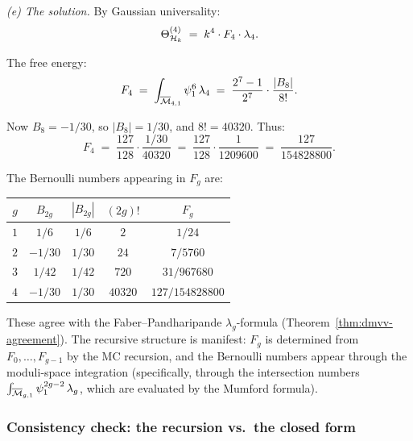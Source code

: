 \begin{computation}
\medskip\noindent\emph{(e) The solution.}
By Gaussian universality:
\begin{equation}\label{eq:thqg-VII-heis-theta4}
\Theta^{(4)}_{\mathcal{H}_k}
\;=\;
k^4 \cdot F_4 \cdot \lambda_4.
\end{equation}

The free energy:
\begin{equation}\label{eq:thqg-VII-heis-F4}
F_4
\;=\;
\int_{\overline{\mathcal{M}}_{4,1}} \psi_1^{6}\,\lambda_4
\;=\;
\frac{2^7 - 1}{2^7} \cdot \frac{|B_8|}{8!}.
\end{equation}

Now $B_8 = -1/30$, so $|B_8| = 1/30$, and $8! = 40320$. Thus:
\begin{equation}\label{eq:thqg-VII-heis-F4-value}
F_4
\;=\;
\frac{127}{128} \cdot \frac{1/30}{40320}
\;=\;
\frac{127}{128} \cdot \frac{1}{1209600}
\;=\;
\frac{127}{154828800}.
\end{equation}
\end{computation}

\begin{remark}
\label{rem:thqg-VII-bernoulli}
The Bernoulli numbers appearing in $F_g$ are:
\begin{center}
\begin{tabular}{ccccc}
$g$ & $B_{2g}$ & $|B_{2g}|$ & $(2g)!$ & $F_g$ \\
\hline
$1$ & $1/6$ & $1/6$ & $2$ & $1/24$ \\
$2$ & $-1/30$ & $1/30$ & $24$ & $7/5760$ \\
$3$ & $1/42$ & $1/42$ & $720$ & $31/967680$ \\
$4$ & $-1/30$ & $1/30$ & $40320$ & $127/154828800$
\end{tabular}
\end{center}
These agree with the Faber--Pandharipande $\lambda_g$-formula
(Theorem~\ref{thm:dmvv-agreement}). The recursive structure
is manifest: $F_g$ is determined from $F_0, \ldots, F_{g-1}$
by the MC recursion, and the Bernoulli numbers appear through
the moduli-space integration (specifically, through the
intersection numbers $\int_{\overline{\mathcal{M}}_{g,1}}
\psi_1^{2g-2}\,\lambda_g$, which are evaluated by the Mumford
formula).
\end{remark}

\subsubsection{Consistency check: the recursion vs.\ the closed form}
\label{subsubsec:thqg-VII-consistency}

